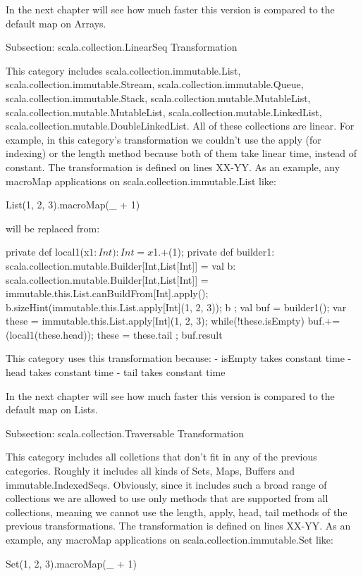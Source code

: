 In the next chapter will see how much faster this version is compared to the
default map on Arrays.

Subsection: scala.collection.LinearSeq Transformation

This category includes scala.collection.immutable.List,
scala.collection.immutable.Stream, scala.collection.immutable.Queue,
scala.collection.immutable.Stack, scala.collection.mutable.MutableList,
scala.collection.mutable.MutableList, scala.collection.mutable.LinkedList,
scala.collection.mutable.DoubleLinkedList. All of these collections are linear.
For example, in this category's transformation we couldn't use the apply (for
indexing) or the length method because both of them take linear time, instead of
constant. The transformation is defined on lines XX-YY. As an example, any
macroMap applications on scala.collection.immutable.List like:

List(1, 2, 3).macroMap(_ + 1)

will be replaced from:

{
  private def local1(x$1: Int): Int = x$1.+(1);
  private def builder1: scala.collection.mutable.Builder[Int,List[Int]] = {
    val b: scala.collection.mutable.Builder[Int,List[Int]] =
immutable.this.List.canBuildFrom[Int].apply();
    b.sizeHint(immutable.this.List.apply[Int](1, 2, 3));
    b
  };
  val buf = builder1();
  var these = immutable.this.List.apply[Int](1, 2, 3);
  while(!these.isEmpty){
    buf.+=(local1(these.head));
    these = these.tail
  };
  buf.result
}

This category uses this transformation because:
- isEmpty takes constant time
- head takes constant time
- tail takes constant time

In the next chapter will see how much faster this version is compared to the
default map on Lists.

Subsection: scala.collection.Traversable Transformation

This category includes all colletions that don't fit in any of the previous
categories. Roughly it includes all kinds of Sets, Maps, Buffers and
immutable.IndexedSeqs. Obviously, since it includes such a broad range of
collections we are allowed to use only methods that are supported from all
collections, meaning we cannot use the length, apply, head, tail methods of the
previous transformations. The transformation is defined on lines XX-YY. As an
example, any macroMap applications on scala.collection.immutable.Set like:

Set(1, 2, 3).macroMap(_ + 1)


